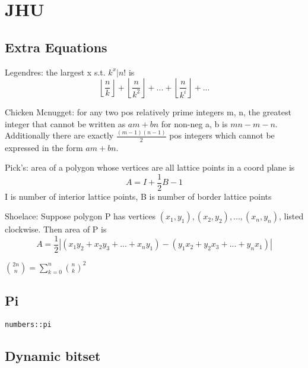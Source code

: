 \chapter{JHU}

\section{Extra Equations}
Legendres: the largest x s.t. $k^{x} | n!$ is
\[ \left \lfloor{\frac{n}{k}}\right \rfloor + \left \lfloor{\frac{n}{k^{2}}}\right \rfloor + ... + \left \lfloor{\frac{n}{k^{i}}}\right \rfloor + ...\]

Chicken Mcnugget: for any two pos relatively prime integers m, n, the greatest integer that cannot be written as $am+bn$ for non-neg a, b is $mn-m-n$. Additionally
there are exactly $\frac{(m-1)(n-1)}{2}$ pos integers which cannot be expressed in the form $am+bn$.

Pick's: area of a polygon whose vertices are all lattice points in a coord plane is 
\[ A = I + \frac{1}{2}B-1\]
I is number of interior lattice points, B is number of border lattice points

Shoelace: Suppose polygon P has vertices $(x_1, y_1), (x_2, y_2), ..., (x_n, y_n)$, listed clockwise. Then area of P is
\[ A = \frac{1}{2}|(x_1y_2 + x_2y_3 + ... + x_ny_1) - (y_1x_2+y_2x_3+...+y_nx_1)|\]

${2n \choose n} = \sum_{k=0}^{n}{n \choose k}^{2}$

\section{Pi}
\lstinline|numbers::pi|

\section{Dynamic bitset}
